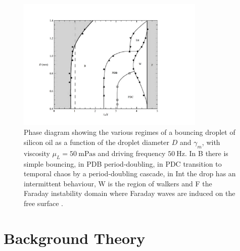 \documentclass[11pt]{article}
\begin{document}
\begin{figure}[t]
    \centering
    \includegraphics[trim={25mm 15mm 25mm 15mm},clip,width=0.8\textwidth]{PhaseDiagram.pdf}
    \caption{Phase diagram showing the various regimes of a bouncing droplet of silicon oil as a function of the droplet diameter $D$ and $\gamma_m$, with viscosity $\mu_L=\SI{50}{\milli\pascal\second}$ and driving frequency $\SI{50}{\hertz}$.  In B there is simple bouncing, in PDB period-doubling, in PDC transition to temporal chaos by a period-doubling cascade, in Int the drop has an intermittent behaviour, W is the region of walkers and F the Faraday instability domain where Faraday waves are induced on the free surface \cite{9}.}
    \label{figphasediagram}
\end{figure}

\section{Background Theory}
\label{secbackgroundtheory}

\end{document}
